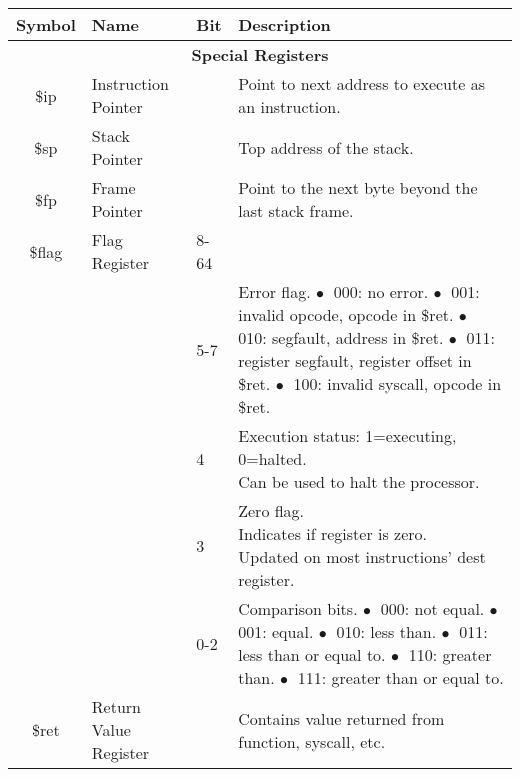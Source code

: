 \documentclass{article}
\begin{document}
\bigskip
\begin{longtable}{|c|l|l|l|}
    \hline
    \textbf{Symbol} & \textbf{Name} & \textbf{Bit} & \textbf{Description} \\
    \hline
    \multicolumn{4}{|c|}{\textbf{Special Registers}} \\
    \hline
    \$ip & Instruction Pointer &  & Point to next address to execute as an instruction. \\
    \hline
    \$sp & Stack Pointer &  & Top address of the stack. \\
    \hline
    \$fp & Frame Pointer &  & Point to the next byte beyond the last stack frame. \\
    \hline
    \$flag & Flag Register & 8-64 & \\
    \cline{3-4}
    & & 5-7 & \makecell[l]{Error flag.\\%
    \(\bullet\;\) 000: no error.\\%
    \(\bullet\;\) 001: invalid opcode, opcode in \$ret.\\%
    \(\bullet\;\) 010: segfault, address in \$ret.\\%
    \(\bullet\;\) 011: register segfault, register offset in \$ret.\\%
    \(\bullet\;\) 100: invalid syscall, opcode in \$ret.\\%
    } \\
    \cline{3-4}
    & & 4 & \makecell[l]{Execution status: 1=executing, 0=halted.\\%
    Can be used to halt the processor.} \\
    \cline{3-4}
    & & 3 & \makecell[l]{Zero flag.\\%
    Indicates if register is zero.\\%
    Updated on most instructions' dest register.} \\
    \cline{3-4}
    & & 0-2 & \makecell[l]{Comparison bits.\\%
    \(\bullet\;\) 000: not equal.\\%
    \(\bullet\;\) 001: equal.\\%
    \(\bullet\;\) 010: less than.\\%
    \(\bullet\;\) 011: less than or equal to.\\%
    \(\bullet\;\) 110: greater than.\\%
    \(\bullet\;\) 111: greater than or equal to.\\%
    } \\
    \hline
    \$ret & Return Value Register & & \makecell[l]{Contains value returned from function, syscall, etc.\\%
}
\end{longtable}
\end{document}

